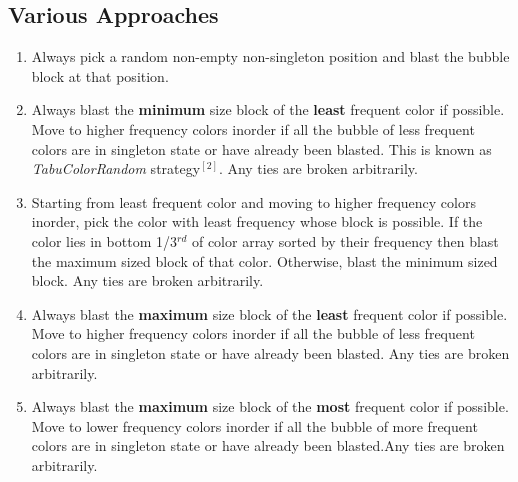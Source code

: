 \documentclass[twoside]{article}
\begin{document}
\begin{multicols}{2}
\section{Various Approaches}
\begin{enumerate}
\item Always pick a random non-empty non-singleton position and blast the bubble block at that position.
\item Always blast the \textbf{minimum} size block of the \textbf{least} frequent color if possible. Move to higher frequency colors inorder if all the bubble of less frequent colors are in singleton state or have already been blasted. This is known as \textit{TabuColorRandom} strategy$^{[2]}$. Any ties are broken arbitrarily.
\item Starting from least frequent color and moving to higher frequency colors inorder, pick the color with least frequency whose block is possible. If the color lies in bottom 1/3$^{rd}$ of color array sorted by their frequency then blast the maximum sized block of that color. Otherwise, blast the minimum sized block. Any ties are broken arbitrarily.
\item Always blast the \textbf{maximum} size block of the \textbf{least} frequent color if possible. Move to higher frequency colors inorder if all the bubble of less frequent colors are in singleton state or have already been blasted. Any ties are broken arbitrarily.
\item Always blast the \textbf{maximum} size block of the \textbf{most} frequent color if possible. Move to lower frequency colors inorder if all the bubble of more frequent colors are in singleton state or have already been blasted.Any ties are broken arbitrarily.
\end{enumerate}

\end{multicols}
\end{document}
